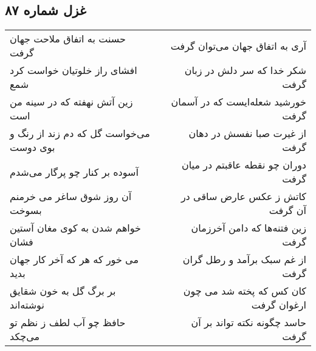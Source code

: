 \begin{center}
\section*{غزل شماره ۸۷}
\label{sec:sh087}
\begin{longtable}{l p{0.5cm} r}
حسنت به اتفاق ملاحت جهان گرفت
&&
آری به اتفاق جهان می‌توان گرفت
\\
افشای راز خلوتیان خواست کرد شمع
&&
شکر خدا که سر دلش در زبان گرفت
\\
زین آتش نهفته که در سینه من است
&&
خورشید شعله‌ایست که در آسمان گرفت
\\
می‌خواست گل که دم زند از رنگ و بوی دوست
&&
از غیرت صبا نفسش در دهان گرفت
\\
آسوده بر کنار چو پرگار می‌شدم
&&
دوران چو نقطه عاقبتم در میان گرفت
\\
آن روز شوق ساغر می خرمنم بسوخت
&&
کاتش ز عکس عارض ساقی در آن گرفت
\\
خواهم شدن به کوی مغان آستین فشان
&&
زین فتنه‌ها که دامن آخرزمان گرفت
\\
می خور که هر که آخر کار جهان بدید
&&
از غم سبک برآمد و رطل گران گرفت
\\
بر برگ گل به خون شقایق نوشته‌اند
&&
کان کس که پخته شد می چون ارغوان گرفت
\\
حافظ چو آب لطف ز نظم تو می‌چکد
&&
حاسد چگونه نکته تواند بر آن گرفت
\\
\end{longtable}
\end{center}
